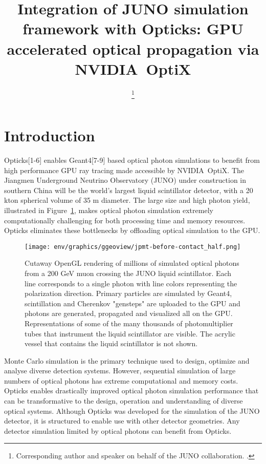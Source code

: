 \documentclass{webofc}
\begin{document}
%
\title{Integration of JUNO simulation framework with Opticks: GPU accelerated optical propagation via NVIDIA\textregistered\ OptiX\texttrademark}

\author{ \fnsep\thanks{Corresponding author and speaker on behalf of the JUNO collaboration. .}}



\abstract{%

}
%
\maketitle
%
%
\section{Introduction}%
\label{intro}
%
Opticks[1-6] enables Geant4[7-9] based optical photon simulations 
to benefit from high performance GPU ray tracing made accessible 
by NVIDIA\textregistered\ OptiX\texttrademark[10-12].
%
The Jiangmen Underground Neutrino Observatory (JUNO)\cite{juno} 
under construction in southern China will be the world's largest liquid scintillator detector, 
with a 20 kton spherical volume of 35 m diameter. The large size and high photon yield, illustrated in Figure~\ref{problem}, 
makes optical photon simulation extremely computationally challenging for both processing time and memory resources. 
Opticks eliminates these bottlenecks by offloading optical simulation to the GPU. 
%
%
\begin{figure}
\centering
\texttt{[image: env/graphics/ggeoview/jpmt-before-contact\_half.png]}
\caption{Cutaway OpenGL rendering of millions of simulated optical photons from a 200 GeV muon crossing the JUNO liquid scintillator. 
Each line corresponds to a single photon with line colors representing the polarization direction. Primary particles
are simulated by Geant4, scintillation and Cherenkov "gensteps" are uploaded to the GPU and photons are generated, propagated
and visualized all on the GPU. Representations of some of the many thousands of photomultiplier tubes that instrument the liquid scintillator are visible.
The acrylic vessel that contains the liquid scintillator is not shown.
}
\label{problem}
\end{figure}%
%
Monte Carlo simulation is the primary technique used to design, optimize 
and analyse diverse detection systems. However, sequential simulation of large numbers of 
optical photons has extreme computational and memory costs. 
Opticks enables drastically improved optical photon simulation performance that can be transformative 
to the design, operation and understanding of diverse optical systems.
%
Although Opticks was developed for the simulation of the JUNO detector, it 
is structured to enable use with other detector geometries. 
Any detector simulation limited by optical photons 
can benefit from Opticks.
\end{document}
